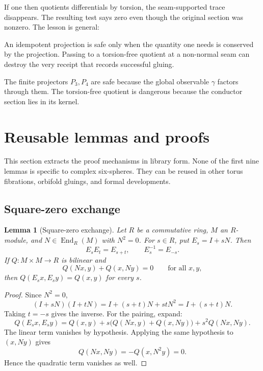\documentclass[11pt,reqno]{amsart}
\numberwithin{equation}{section}
\newtheorem{lemma}[theorem]{Lemma}
\theoremstyle{definition}
\begin{document}
If one then quotients differentials by torsion, the seam-supported trace disappears. The resulting test says zero even though the original section was nonzero. The lesson is general:

\begin{center}
\begin{minipage}{0.88\textwidth}
An idempotent projection is safe only when the quantity one needs is conserved by the projection. Passing to a torsion-free quotient at a non-normal seam can destroy the very receipt that records successful gluing.
\end{minipage}
\end{center}

The finite projectors $P_3,P_4$ are safe because the global observable $\gamma$ factors through them. The torsion-free quotient is dangerous because the conductor section lies in its kernel.

\section{Reusable lemmas and proofs}\label{sec:lemmas}

This section extracts the proof mechanisms in library form. None of the first nine lemmas is specific to complex six-spheres. They can be reused in other torus fibrations, orbifold gluings, and formal developments.

\subsection{Square-zero exchange}

\begin{lemma}[Square-zero exchange]\label{lem:square-zero-exchange}
Let $R$ be a commutative ring, $M$ an $R$-module, and $N\in\operatorname{End}_R(M)$ with $N^2=0$. For $s\in R$, put $E_s=I+sN$. Then
\[
E_sE_t=E_{s+t},
\qquad
E_s^{-1}=E_{-s}.
\]
If $Q:M\times M\to R$ is bilinear and
\[
Q(Nx,y)+Q(x,Ny)=0
\qquad\text{for all }x,y,
\]
then $Q(E_sx,E_sy)=Q(x,y)$ for every $s$.
\end{lemma}

\begin{proof}
Since $N^2=0$,
\[
(I+sN)(I+tN)=I+(s+t)N+stN^2=I+(s+t)N.
\]
Taking $t=-s$ gives the inverse. For the pairing, expand:
\[
Q(E_sx,E_sy)=Q(x,y)+s\bigl(Q(Nx,y)+Q(x,Ny)\bigr)+s^2Q(Nx,Ny).
\]
The linear term vanishes by hypothesis. Applying the same hypothesis to $(x,Ny)$ gives
\[
Q(Nx,Ny)=-Q(x,N^2y)=0.
\]
Hence the quadratic term vanishes as well.
\end{proof}
\end{document}
